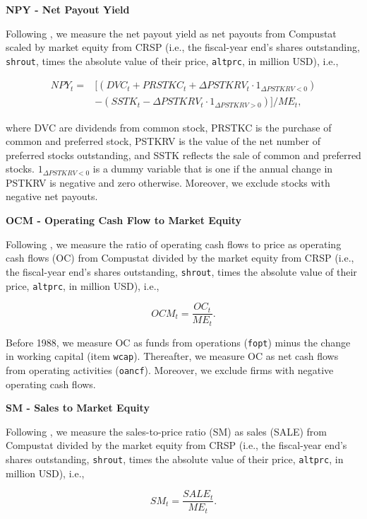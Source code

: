 \documentclass[
  article]{jss}
\begin{document}
\textbf{NPY - Net Payout Yield}

Following \citet{boudoukh.2007}, we measure the net payout yield as net
payouts from Compustat scaled by market equity from CRSP (i.e., the
fiscal-year end's shares outstanding, \texttt{shrout}, times the
absolute value of their price, \texttt{altprc}, in million USD), i.e.,

\begin{align*}
NPY_{t} = &\big[(DVC_{t} + PRSTKC_{t} + \Delta PSTKRV_{t} \cdot {1}_{\Delta PSTKRV <0}) \\
&- (SSTK_{t} - \Delta PSTKRV_{t} \cdot {1}_{\Delta PSTKRV >0})\big] / ME_{t}\text{,}
\end{align*}

where DVC are dividends from common stock, PRSTKC is the purchase of
common and preferred stock, PSTKRV is the value of the net number of
preferred stocks outstanding, and SSTK reflects the sale of common and
preferred stocks. \({1}_{\Delta PSTKRV <0}\) is a dummy variable that is
one if the annual change in PSTKRV is negative and zero otherwise.
Moreover, we exclude stocks with negative net payouts.

\textbf{OCM - Operating Cash Flow to Market Equity}

Following \citet{desai.2004}, we measure the ratio of operating cash
flows to price as operating cash flows (OC) from Compustat divided by
the market equity from CRSP (i.e., the fiscal-year end's shares
outstanding, \texttt{shrout}, times the absolute value of their price,
\texttt{altprc}, in million USD), i.e.,

\[
OCM_{t} = \frac{OC_{t}}{ME_{t}}\text{.}
\]

Before 1988, we measure OC as funds from operations (\texttt{fopt})
minus the change in working capital (item \texttt{wcap}). Thereafter, we
measure OC as net cash flows from operating activities (\texttt{oancf}).
Moreover, we exclude firms with negative operating cash flows.

\textbf{SM - Sales to Market Equity}

Following \citet{barbee.1996}, we measure the sales-to-price ratio (SM)
as sales (SALE) from Compustat divided by the market equity from CRSP
(i.e., the fiscal-year end's shares outstanding, \texttt{shrout}, times
the absolute value of their price, \texttt{altprc}, in million USD),
i.e.,

\[
SM_{t} = \frac{SALE_{t}}{ME_{t}}\text{.}
\]
\end{document}
